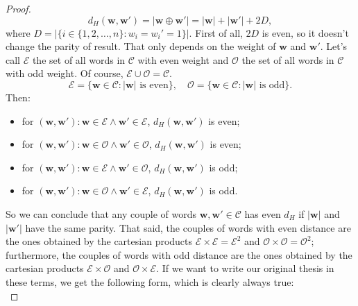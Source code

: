 \begin{lemma}
\begin{proof}
        \begin{equation}
            d_H(\mathbf{w}, \mathbf{w}') = |\mathbf{w} \oplus \mathbf{w}'| = |\textbf{w}| + |\textbf{w}'| + 2D,
        \end{equation}
        where $D=|\{i \in \{1,2,\ldots,n\}:w_i=w_i'=1\}|$.
        First of all, $2D$ is even, so it doesn't change the parity of result. That only depends on the weight of $\mathbf{w}$ and $\mathbf{w}'$.
        Let's call $\mathcal{E}$ the set of all words in $\mathcal{C}$ with even weight and $\mathcal{O}$ the set of all words in $\mathcal{C}$ with odd weight. Of course, $\mathcal{E} \cup \mathcal{O} = \mathcal{C}$.
        \begin{equation}
            \mathcal{E} = \{\mathbf{w} \in \mathcal{C} : |\mathbf{w}|\text{ is even}\}, \quad \mathcal{O} = \{\mathbf{w} \in \mathcal{C} : |\mathbf{w}|\text{ is odd}\}.
        \end{equation}
        Then:
        \begin{itemize}
            \item for $(\mathbf{w}, \mathbf{w}'): \mathbf{w} \in \mathcal{E} \land \mathbf{w}' \in \mathcal{E}$, $d_H(\mathbf{w}, \mathbf{w}')$ is even;
            \item for $(\mathbf{w}, \mathbf{w}'): \mathbf{w} \in \mathcal{O} \land \mathbf{w}' \in \mathcal{O}$, $d_H(\mathbf{w}, \mathbf{w}')$ is even;
            \item for $(\mathbf{w}, \mathbf{w}'): \mathbf{w} \in \mathcal{E} \land \mathbf{w}' \in \mathcal{O}$, $d_H(\mathbf{w}, \mathbf{w}')$ is odd;
            \item for $(\mathbf{w}, \mathbf{w}'): \mathbf{w} \in \mathcal{O} \land \mathbf{w}' \in \mathcal{E}$, $d_H(\mathbf{w}, \mathbf{w}')$ is odd.
        \end{itemize}
        So we can conclude that any couple of words $\mathbf{w}, \mathbf{w}' \in \mathcal{C}$ has even $d_H$ if $|\mathbf{w}|$ and $|\mathbf{w}'|$ have the same parity.
        That said, the couples of words with even distance are the ones obtained by the cartesian products $\mathcal{E} \times \mathcal{E}=\mathcal{E}^2$ and $\mathcal{O} \times \mathcal{O}=\mathcal{O}^2$; furthermore, the couples of words with odd distance are the ones obtained by the cartesian products $\mathcal{E} \times \mathcal{O}$ and $\mathcal{O} \times \mathcal{E}$.
        If we want to write our original thesis in these terms, we get the following form, which is clearly always true:
        \begin{equation}

\end{equation}
\end{proof}
\end{lemma}
